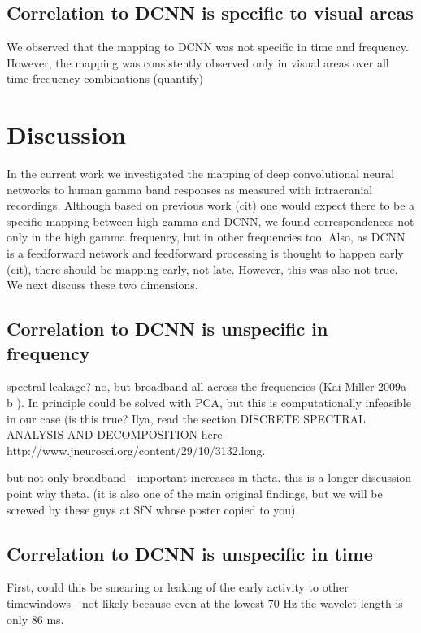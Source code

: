 \documentclass[final]{jneurosci}
\begin{document}
\subsection{Correlation to DCNN is specific to visual areas}

We observed that the mapping to DCNN was not specific in time and frequency. However, the mapping was consistently observed only in visual areas over all time-frequency combinations (quantify)

\section{Discussion}

In the current work we investigated the mapping of deep convolutional neural networks to human gamma band responses as measured with intracranial recordings. Although based on previous work (cit) one would expect there to be a specific mapping between high gamma and DCNN, we found correspondences not only in the high gamma frequency, but in other frequencies too. Also, as DCNN is a feedforward network and feedforward processing is thought to happen early (cit), there should be mapping early, not late. However, this was also not true. We next discuss these two dimensions.

\subsection{Correlation to DCNN is unspecific in frequency}

spectral leakage? no, but broadband all across the frequencies (Kai Miller 2009a b ). In principle could be solved with PCA, but this is computationally infeasible in our case (is this true? Ilya, read the section DISCRETE SPECTRAL ANALYSIS AND DECOMPOSITION here http://www.jneurosci.org/content/29/10/3132.long.

but not only broadband - important increases in theta. this is a longer discussion point why theta. (it is also one of the main original findings, but we will be screwed by these guys at SfN whose poster copied to you)

\subsection{Correlation to DCNN is unspecific in time}

First, could this be smearing or leaking of the early activity to other timewindows - not likely because even at the lowest 70 Hz the wavelet length is only 86 ms. 
\end{document}
